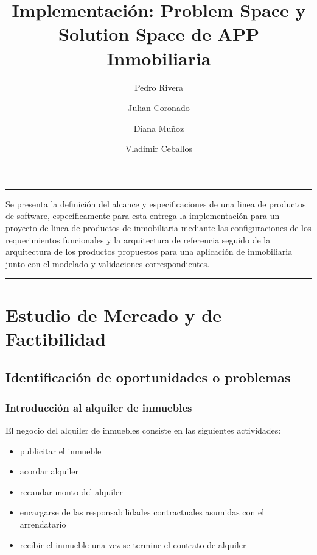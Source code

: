 \documentclass[letterpaper]{article}
\title{\textbf{ Implementación: Problem Space y Solution Space de APP Inmobiliaria }}
\author[1]{Pedro Rivera}
\author[2]{Julian Coronado}
\author[3]{Diana Muñoz}
\author[4]{Vladimir Ceballos}
\affil[1-3]{ Lineas de Productos de Software,
Pontificia Universidad Javeriana Cali}
\begin{document}
\maketitle
\renewenvironment{abstract}
 {\quotation\small\noindent\rule{\linewidth}{.5pt}\par\smallskip
  {\centering\bfseries\abstractname\par}\medskip}
 {\par\noindent\rule{\linewidth}{.5pt}\endquotation}

\begin{abstract}
Se presenta la definición del alcance y especificaciones de una linea de productos de software, específicamente para esta entrega la implementación para un proyecto de linea de productos de inmobiliaria mediante las configuraciones de los requerimientos funcionales y la arquitectura de referencia seguido de la arquitectura de los productos propuestos para una aplicación de inmobiliaria junto con el modelado y validaciones correspondientes.
\end{abstract}


\section{\textbf{Estudio de Mercado y de Factibilidad}} 

\subsection{Identificación de oportunidades o problemas}

\subsubsection{Introducción al alquiler de inmuebles}

El negocio del alquiler de inmuebles consiste en las siguientes actividades:

\begin{itemize}
    \item publicitar el inmueble
    \item acordar alquiler
    \item recaudar monto del alquiler
    \item encargarse de las responsabilidades contractuales asumidas con el arrendatario
    \item recibir el inmueble una vez se termine el contrato de alquiler
\end{itemize}
\end{document}
